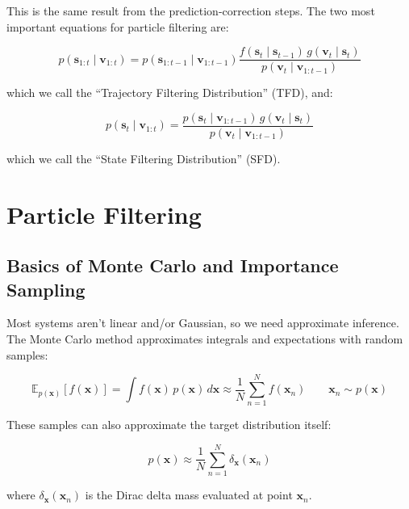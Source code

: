 \documentclass[11pt,a4paper]{article}
\begin{document}
This is the same result from the prediction-correction steps. The two most important equations for particle filtering are:

\begin{equation}
\label{eq:TFD}
\boxed{p(\mathbf{s}_{1:t} \mid \mathbf{v}_{1:t}) = p(\mathbf{s}_{1:t-1} \mid \mathbf{v}_{1:t-1}) \frac{f(\mathbf{s}_t \mid \mathbf{s}_{t-1}) \, g(\mathbf{v}_t \mid \mathbf{s}_t)}{p(\mathbf{v}_t \mid \mathbf{v}_{1:t-1})}}
\end{equation}

which we call the ``Trajectory Filtering Distribution'' (TFD), and:

\begin{equation}
\label{eq:SFD}
\boxed{p(\mathbf{s}_t \mid \mathbf{v}_{1:t}) = \frac{p(\mathbf{s}_t \mid \mathbf{v}_{1:t-1}) \, g(\mathbf{v}_t \mid \mathbf{s}_t)}{p(\mathbf{v}_t \mid \mathbf{v}_{1:t-1})}}
\end{equation}

which we call the ``State Filtering Distribution'' (SFD).

\section{Particle Filtering}

\subsection{Basics of Monte Carlo and Importance Sampling}

Most systems aren't linear and/or Gaussian, so we need approximate inference. The Monte Carlo method approximates integrals and expectations with random samples:

\begin{equation}
\label{eq:mc}
\mathbb{E}_{p(\mathbf{x})}[f(\mathbf{x})] = \int f(\mathbf{x}) \, p(\mathbf{x}) \, d\mathbf{x} \approx \frac{1}{N} \sum_{n=1}^{N} f(\mathbf{x}_n) \qquad \mathbf{x}_n \sim p(\mathbf{x})
\end{equation}

These samples can also approximate the target distribution itself:

\begin{equation}
p(\mathbf{x}) \approx \frac{1}{N} \sum_{n=1}^{N} \delta_{\mathbf{x}}(\mathbf{x}_n)
\end{equation}

where $\delta_{\mathbf{x}}(\mathbf{x}_n)$ is the Dirac delta mass evaluated at point $\mathbf{x}_n$.
\end{document}
